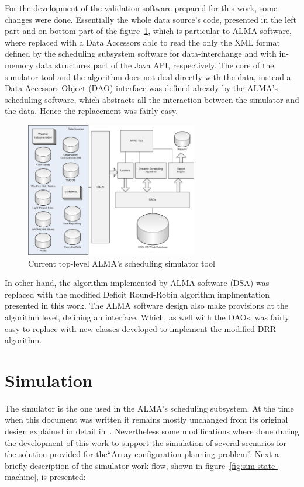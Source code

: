 For the development of the validation software prepared for this work, some changes were done. Essentially the whole data source's code, presented in the left part and on bottom part of the figure~\ref{fig:sim-top-level-architecture}, which is particular to ALMA software, where replaced with a Data Accessors able to read the only the XML format defined by the scheduling subsystem software for data-interchange and with in-memory data structures part of the Java API, respectively. The core of the simulator tool and the algorithm does not deal directly with the data, instead a Data Accessors Object (DAO) interface was defined already by the ALMA's scheduling software, which abstracts all the interaction between the simulator and the data. Hence the replacement was fairly easy.

\begin{figure}[h!]	
\begin{center}
\includegraphics[width=0.67\textwidth]{images/simulator-arch}
\end{center}
\caption{Current top-level ALMA's scheduling simulator tool}
\label{fig:sim-top-level-architecture}
\end{figure}

In other hand, the algorithm implemented by ALMA software (DSA) was replaced with the modified Deficit Round-Robin algorithm implmentation presented in this work. The ALMA software design also make provisions at the algorithm level, defining an interface. Which, as well with the DAOs, was fairly easy to replace with new classes developed to implement the modified DRR algorithm.

\section {Simulation}
The simulator is the one used in the ALMA's scheduling subsystem. At the time when this document was written it remains mostly unchanged from its original design explained in detail in~\cite{hoffstadt10}. Nevertheless some modifications where done during the development of this work to support the simulation of several scenarios for the solution provided for the``Array configuration planning problem''. Next a briefly description of the simulator work-flow, shown in figure~\ref{fig:sim-state-machine}, is presented:


